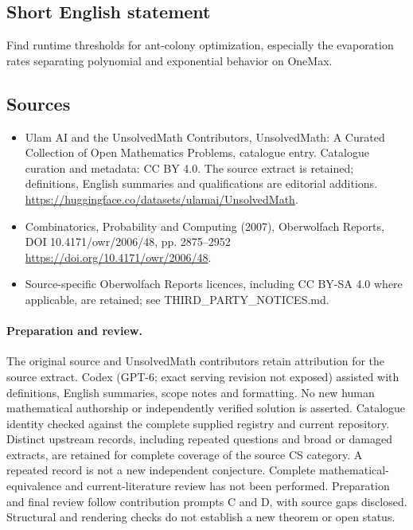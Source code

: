 \documentclass[11pt]{article}
\begin{document}
\subsection{Short English statement}
Find runtime thresholds for ant-colony optimization, especially the evaporation rates separating polynomial and exponential behavior on OneMax.
\subsection{Sources}
\begin{itemize}
\item[\hypertarget{source:statement:1}{S1}] Ulam AI and the UnsolvedMath Contributors, UnsolvedMath: A Curated Collection of Open Mathematics Problems, catalogue entry. Catalogue curation and metadata: CC BY 4.0. The source extract is retained; definitions, English summaries and qualifications are editorial additions.
\url{https://huggingface.co/datasets/ulamai/UnsolvedMath}.
\item[\hypertarget{source:statement:2}{S2}] Combinatorics, Probability and Computing (2007), Oberwolfach Reports, DOI 10.4171/owr/2006/48, pp. 2875--2952
\url{https://doi.org/10.4171/owr/2006/48}.
\item Source-specific Oberwolfach Reports licences, including CC BY-SA 4.0 where applicable, are retained; see THIRD\_PARTY\_NOTICES.md.
\end{itemize}
\paragraph{Preparation and review.}
The original source and UnsolvedMath contributors retain attribution for the source extract. Codex (GPT-6; exact serving revision not exposed) assisted with definitions, English summaries, scope notes and formatting. No new human mathematical authorship or independently verified solution is asserted. Catalogue identity checked against the complete supplied registry and current repository. Distinct upstream records, including repeated questions and broad or damaged extracts, are retained for complete coverage of the source CS category. A repeated record is not a new independent conjecture. Complete mathematical-equivalence and current-literature review has not been performed. Preparation and final review follow contribution prompts C and D, with source gaps disclosed. Structural and rendering checks do not establish a new theorem or open status.
\label{end:statement}
\end{document}
